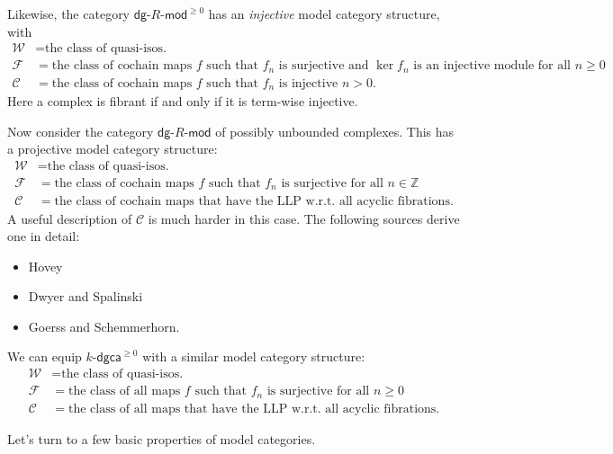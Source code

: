 \documentclass[10pt,letterpaper,cm]{nupset}
\theoremstyle{definition}
\theoremstyle{theorem}
\theoremstyle{remark}
\newcommand{\Z}{\mathbb Z}
\newcommand{\1}{\mathbb{1}}
\newcommand{\cf}{\mathscr{C}}
\newcommand{\f}{\mathscr{F}}
\newcommand{\w}{\mathscr{W}}
\newcommand{\dgca}{\mathsf{dgca}}
\newcommand{\dg}{\mathsf{dg}}
\newcommand{\0}{\vec 0}
\newcommand{\bi}{\begin{itemize}}
\newcommand{\ei}{\end{itemize}}
\begin{document}
\medskip

Likewise, the category $\dg{\text{-}}R{\text{-}}\mathsf{mod}^{\geq 0}$ has an \textit{injective} model category structure, with
\begin{align*}
\w & = \text{the class of quasi-isos.}
\\ \f & = \text{the class of cochain maps $f$ such that $f_n$ is surjective and $\ker{f_n}$ is an injective module for all $n\geq 0$}
\\ \cf & =  \text{the class of cochain maps $f$ such that $f_n$ is injective $n > 0$}
. 
\end{align*} 
Here a complex is fibrant if and only if it is term-wise injective. 

\medskip

Now consider the category $\dg{\text{-}}R{\text{-}}\mathsf{mod}$ of possibly unbounded complexes. This has a projective model category structure:
\begin{align*}
\w & = \text{the class of quasi-isos.}
\\ \f & = \text{the class of cochain maps $f$ such that $f_n$ is surjective for all $n\in \Z$}
\\ \cf & =  \text{the class of cochain maps that have the LLP w.r.t. all acyclic fibrations}
. 
\end{align*}
A useful description of $\cf$ is much harder in this case. The following sources derive one in detail:
\bi
\item Hovey
\item Dwyer and Spalinski
\item Goerss and Schemmerhorn.
\ei

We can equip $k\text{-}\dgca^{\geq 0}$ with a similar model category structure:
\begin{align*}
\w & = \text{the class of quasi-isos.}
\\ \f & = \text{the class of all maps $f$ such that $f_n$ is surjective for all $n\geq 0$}
\\ \cf & =  \text{the class of all maps that have the LLP w.r.t. all acyclic fibrations}
. 
\end{align*}

\medskip

Let's turn to a few basic properties of model categories.
\end{document}
